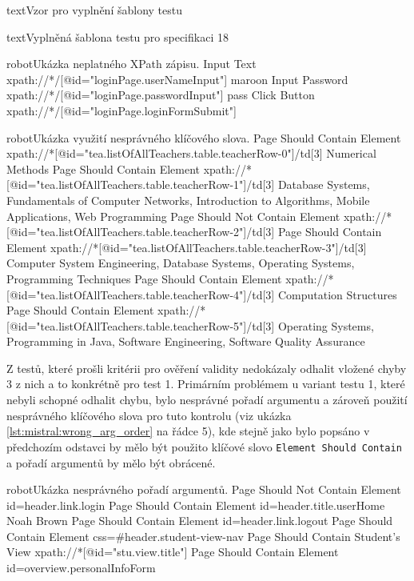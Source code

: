 \documentclass[czech, ma, kiv, he, iso690numb, pdf, viewonly]{fasthesis}
\begin{document}
\begin{code}{text}{Vzor pro vyplnění šablony testu \label{lst:template}}
{\begin{code}{text}{Vyplněná šablona testu pro specifikaci 18 \label{lst:spec18}}
{        \begin{code}{robot}{Ukázka neplatného XPath zápisu. \label{lst:mistral:wrong_xpath}}
Input Text    xpath://*/[@id="loginPage.userNameInput"]    maroon
Input Password    xpath://*/[@id="loginPage.passwordInput"]    pass
Click Button    xpath://*/[@id="loginPage.loginFormSubmit"]
        \end{code}

        \begin{code}{robot}{Ukázka využití nesprávného klíčového slova. \label{lst:mistral:incorrect_keyword}}
Page Should Contain Element    xpath://*[@id="tea.listOfAllTeachers.table.teacherRow-0"]/td[3]    Numerical Methods
Page Should Contain Element    xpath://*[@id="tea.listOfAllTeachers.table.teacherRow-1"]/td[3]    Database Systems, Fundamentals of Computer Networks, Introduction to Algorithms, Mobile Applications, Web Programming
Page Should Not Contain Element    xpath://*[@id="tea.listOfAllTeachers.table.teacherRow-2"]/td[3]
Page Should Contain Element    xpath://*[@id="tea.listOfAllTeachers.table.teacherRow-3"]/td[3]    Computer System Engineering, Database Systems, Operating Systems, Programming Techniques
Page Should Contain Element    xpath://*[@id="tea.listOfAllTeachers.table.teacherRow-4"]/td[3]    Computation Structures
Page Should Contain Element    xpath://*[@id="tea.listOfAllTeachers.table.teacherRow-5"]/td[3]    Operating Systems, Programming in Java, Software Engineering, Software Quality Assurance
        \end{code}

        \noindent Z testů, které prošli kritérii pro ověření validity nedokázaly odhalit vložené chyby 3 z nich a to konkrétně pro test 1. Primárním problémem u variant testu 1, které nebyli schopné odhalit chybu, bylo nesprávné pořadí argumentu a zároveň použití nesprávného klíčového slova pro tuto kontrolu (viz ukázka \ref{lst:mistral:wrong_arg_order} na řádce 5), kde stejně jako bylo popsáno v předchozím odstavci by mělo být použito klíčové slovo \verb|Element Should Contain| a pořadí argumentů by mělo být obrácené.

        \begin{code}{robot}{Ukázka nesprávného pořadí argumentů. \label{lst:mistral:wrong_arg_order}}
Page Should Not Contain Element    id=header.link.login
Page Should Contain Element    id=header.title.userHome    Noah Brown
Page Should Contain Element    id=header.link.logout
Page Should Contain Element    css=#header.student-view-nav
Page Should Contain    Student's View    xpath://*[@id="stu.view.title"]
Page Should Contain Element    id=overview.personalInfoForm
        \end{code}

}
\end{code}}
\end{code}
\end{document}
